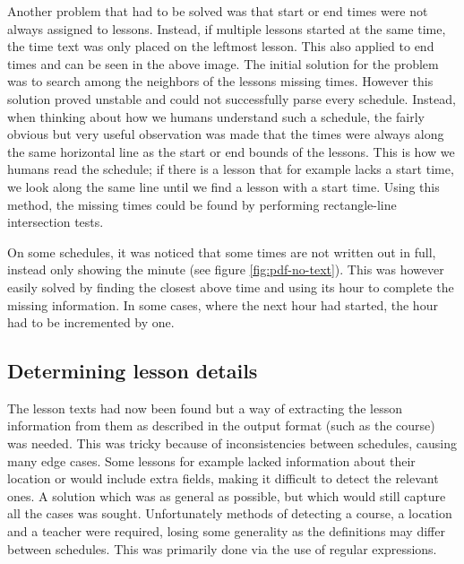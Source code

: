 \documentclass{article}
\begin{document}
	Another problem that had to be solved was that start or end times were not always assigned to lessons. Instead, if multiple lessons started at the same time, the time text was only placed on the leftmost lesson. This also applied to end times and can be seen in the above image. The initial solution for the problem was to search among the neighbors of the lessons missing times. However this solution proved unstable and could not successfully parse every schedule. Instead, when thinking about how we humans understand such a schedule, the fairly obvious but very useful observation was made that the times were always along the same horizontal line as the start or end bounds of the lessons. This is how we humans read the schedule; if there is a lesson that for example lacks a start time, we look along the same line until we find a lesson with a start time. Using this method, the missing times could be found by performing rectangle-line intersection tests.
	
	On some schedules, it was noticed that some times are not written out in full, instead only showing the minute (see figure \ref{fig:pdf-no-text}). This was however easily solved by finding the closest above time and using its hour to complete the missing information. In some cases, where the next hour had started, the hour had to be incremented by one.
	
	\subsection{Determining lesson details}
	The lesson texts had now been found but a way of extracting the lesson information from them as described in the output format (such as the course) was needed. This was tricky because of inconsistencies between schedules, causing many edge cases. Some lessons for example lacked information about their location or would include extra fields, making it difficult to detect the relevant ones. A solution which was as general as possible, but which would still capture all the cases was sought. Unfortunately methods of detecting a course, a location and a teacher were required, losing some generality as the definitions may differ between schedules. This was primarily done via the use of regular expressions.
	
\end{document}
